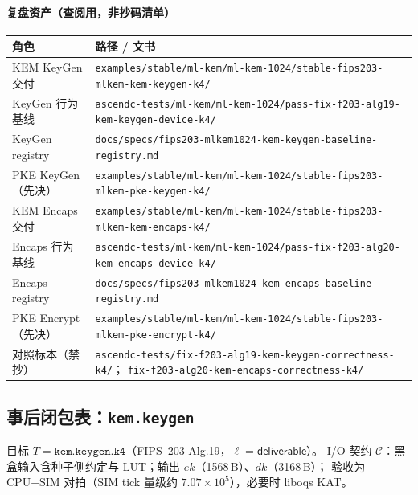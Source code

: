 \documentclass[UTF8,a4paper,11pt]{ctexart}
\theoremstyle{definition}
\theoremstyle{plain}
\theoremstyle{remark}
\numberwithin{figure}{section}
\numberwithin{table}{section}
\begin{document}
\paragraph{复盘资产（查阅用，非抄码清单）}
\begin{center}
\small
\begin{tabular}{@{}L{3.2cm}L{10.6cm}@{}}
  \toprule
  角色 & 路径 / 文书 \\
  \midrule
  KEM KeyGen 交付 &
  \texttt{examples/stable/ml-kem/ml-kem-1024/stable-fips203-mlkem-kem-keygen-k4/} \\
  KeyGen 行为基线 &
  \texttt{ascendc-tests/ml-kem/ml-kem-1024/pass-fix-f203-alg19-kem-keygen-device-k4/} \\
  KeyGen registry &
  \texttt{docs/specs/fips203-mlkem1024-kem-keygen-baseline-registry.md} \\
  PKE KeyGen（先决） &
  \texttt{examples/stable/ml-kem/ml-kem-1024/stable-fips203-mlkem-pke-keygen-k4/} \\
  KEM Encaps 交付 &
  \texttt{examples/stable/ml-kem/ml-kem-1024/stable-fips203-mlkem-kem-encaps-k4/} \\
  Encaps 行为基线 &
  \texttt{ascendc-tests/ml-kem/ml-kem-1024/pass-fix-f203-alg20-kem-encaps-device-k4/} \\
  Encaps registry &
  \texttt{docs/specs/fips203-mlkem1024-kem-encaps-baseline-registry.md} \\
  PKE Encrypt（先决） &
  \texttt{examples/stable/ml-kem/ml-kem-1024/stable-fips203-mlkem-pke-encrypt-k4/} \\
  对照标本（禁抄） &
  \texttt{ascendc-tests/fix-f203-alg19-kem-keygen-correctness-k4/}；
  \texttt{fix-f203-alg20-kem-encaps-correctness-k4/} \\
  \bottomrule
\end{tabular}
\end{center}

\subsection{事后闭包表：\texttt{kem.keygen}}
\label{sec:replay-ct-keygen}

目标 $T=\texttt{kem.keygen.k4}$（FIPS~203 Alg.19，$\ell=\mathsf{deliverable}$）。
I/O 契约 $\mathcal{C}$：黑盒输入含种子侧约定与 LUT；输出 $\mathit{ek}$（1568\,B）、$\mathit{dk}$（3168\,B）；
验收为 CPU+SIM 对拍（SIM tick 量级约 $7.07\times 10^{5}$），必要时 liboqs KAT。
\end{document}
